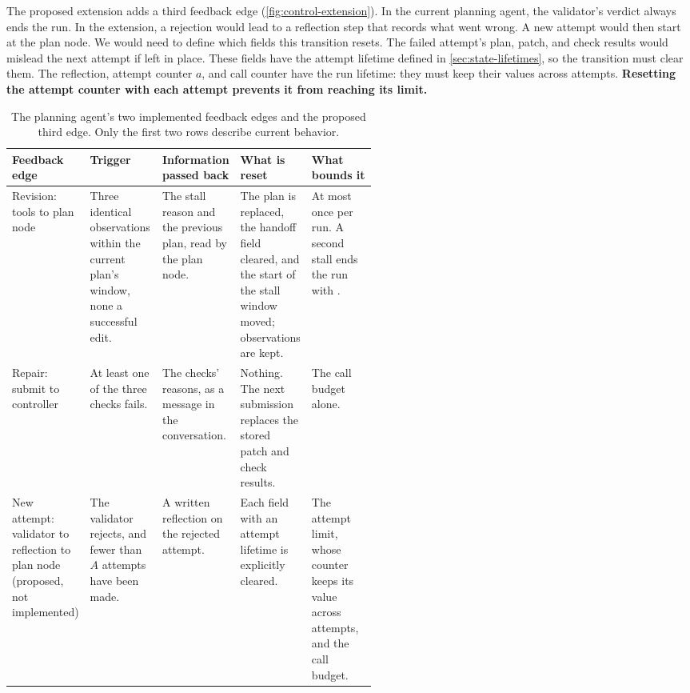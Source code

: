 The proposed extension adds a third feedback edge (\cref{fig:control-extension}). In the current
planning agent, the validator's verdict always ends the run. In the extension, a rejection would
lead to a reflection step that records what went wrong. A new attempt would then start at the
plan node. We would need to define which fields this transition resets. The failed attempt's
plan, patch, and check results would mislead the next attempt if left in place. These fields have
the attempt lifetime defined in \cref{sec:state-lifetimes}, so the transition must clear them.
The reflection, attempt counter $a$, and call counter have the run lifetime: they must keep their
values across attempts. \textbf{Resetting the attempt counter with each attempt prevents it from
reaching its limit.}

\begin{table}[tbp]
  \centering
  \begin{adjustbox}{width=\linewidth}\begin{tabularx}{\linewidth}{@{}L{0.14\linewidth}L{0.2\linewidth}XXL{0.19\linewidth}@{}}
    \toprule
    \textbf{Feedback edge} & \textbf{Trigger} & \textbf{Information passed back} & \textbf{What is reset}
      & \textbf{What bounds it} \\
    \midrule
    Revision: tools to plan node & Three identical observations within the current plan's window, none a
      successful edit. & The stall reason and the previous plan, read by the plan node. & The plan is
      replaced, the handoff field cleared, and the start of the stall window moved; observations are kept. & At
      most once per run. A second stall ends the run with . \\
    Repair: submit to controller & At least one of the three checks fails. & The checks' reasons, as
      a message in the conversation. & Nothing. The next submission replaces the stored patch and
      check results. & The call budget alone. \\
    New attempt: validator to reflection to plan node (proposed, not implemented) & The validator
      rejects, and fewer than $A$ attempts have been made. & A written reflection on the rejected
      attempt. & Each field with an attempt lifetime is explicitly cleared. & The attempt limit,
      whose counter keeps its value across attempts, and the call budget. \\
    \bottomrule
  \end{tabularx}\end{adjustbox}
  \caption{The planning agent's two implemented feedback edges and the proposed third edge. Only the
  first two rows describe current behavior.}
  \label{tab:control-backedges}
\end{table}

